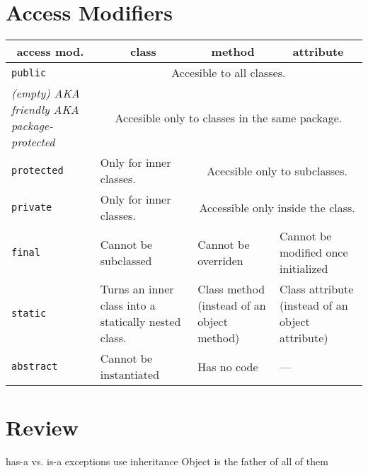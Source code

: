 \documentclass[a4paper, 9pt]{extarticle}
\begin{document}
\section{Access Modifiers}

\begin{center}
  \begin{tabular}{|p{3cm}|p{4cm}|p{4cm}|p{4cm}|}
\hline
\multicolumn{1}{|c|}{access mod.} & \multicolumn{1}{|c|}{class} & \multicolumn{1}{|c|}{method} & \multicolumn{1}{|c|}{attribute} \\
\hline
\texttt{public}    & \multicolumn{3}{|c|}{Accesible to all classes.} \\
\hline
\textsl{(empty) AKA friendly AKA package-protected} & \multicolumn{3}{|c|}{Accesible only to classes in the same package.} \\
\hline
\texttt{protected}   & Only for inner classes. & \multicolumn{2}{|c|}{Acecsible only to subclasses.} \\
\hline
\texttt{private}     & Only for inner classes. & \multicolumn{2}{|c|}{Accessible only inside the class.} \\
\hline
\hline
\texttt{final}       & Cannot be subclassed & Cannot be overriden & Cannot be modified once initialized \\
\hline
\texttt{static}      & Turns an inner class into a statically nested class. & Class method (instead of an object method) & Class attribute (instead of an object attribute) \\
\hline
\texttt{abstract}    & Cannot be instantiated & Has no code & --- \\
\hline
\end{tabular}
\end{center}








\section{Review}

\begin{blackboard}
  has-a vs. is-a
  exceptions use inheritance
  Object is the father of all of them
\end{blackboard}
\end{document}
